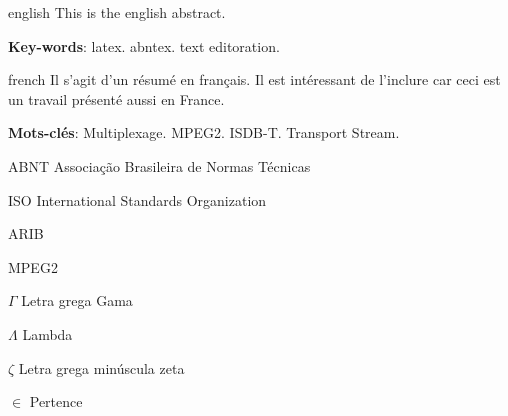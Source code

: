 \documentclass[
	12pt,				%
	openright,			%
	twoside,			%
	a4paper,			%
	english,			%
	french,				%
	brazil				%
	]{abntex2}
\begin{document}
\begin{resumo}[Abstract]
 \begin{otherlanguage*}{english}
   This is the english abstract.

   \vspace{\onelineskip}
 
   \noindent 
   \textbf{Key-words}: latex. abntex. text editoration.
 \end{otherlanguage*}
\end{resumo}

\begin{resumo}[Résumé]
 \begin{otherlanguage*}{french}
    Il s'agit d'un résumé en français. Il est intéressant de l'inclure car ceci est un travail présenté aussi en France.
 
   \textbf{Mots-clés}: Multiplexage. MPEG2. ISDB-T. Transport Stream.
 \end{otherlanguage*}
\end{resumo}

\listoffigures*
\cleardoublepage

\listoftables*
\cleardoublepage

\begin{siglas}
  \item[ABNT] Associação Brasileira de Normas Técnicas
  \item[ISO] International Standards Organization
  \item[ARIB]
  \item[MPEG2]
  \item[]
  \item[]
  \item[]
  \item[]
\end{siglas}

\begin{simbolos}
  \item[$ \Gamma $] Letra grega Gama
  \item[$ \Lambda $] Lambda
  \item[$ \zeta $] Letra grega minúscula zeta
  \item[$ \in $] Pertence
\end{simbolos}
\end{document}
